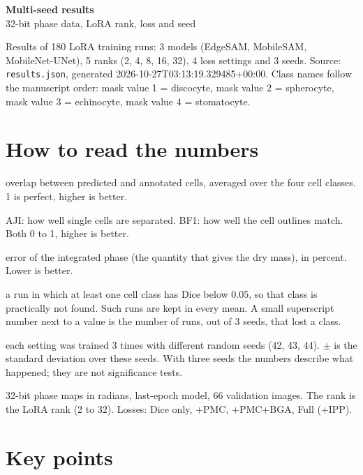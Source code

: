 \documentclass[10pt]{article}
\begin{document}
{\Large\bfseries Multi-seed results}\\[2pt]{\small 32-bit phase data, LoRA rank, loss and seed}\par\vspace{4pt}

Results of 180 LoRA training runs: 3 models (EdgeSAM, MobileSAM, MobileNet-UNet), 5 ranks (2, 4, 8, 16, 32), 4 loss settings and 3 seeds. Source: \texttt{results.json}, generated 2026-10-27T03:13:19.329485+00:00. Class names follow the manuscript order: mask value 1 = discocyte, mask value 2 = spherocyte, mask value 3 = echinocyte, mask value 4 = stomatocyte.

\section*{How to read the numbers}
\begin{description}\itemsep1pt
\item[Dice] overlap between predicted and annotated cells, averaged over the four cell classes. 1 is perfect, higher is better.
\item[AJI, BF1] AJI: how well single cells are separated. BF1: how well the cell outlines match. Both 0 to 1, higher is better.
\item[IPE] error of the integrated phase (the quantity that gives the dry mass), in percent. Lower is better.
\item[Lost class] a run in which at least one cell class has Dice below 0.05, so that class is practically not found. Such runs are kept in every mean. A small superscript number next to a value is the number of runs, out of 3 seeds, that lost a class.
\item[Seeds] each setting was trained 3 times with different random seeds (42, 43, 44). $\pm$ is the standard deviation over these seeds. With three seeds the numbers describe what happened; they are not significance tests.
\item[Setting] 32-bit phase maps in radians, last-epoch model, 66 validation images. The rank is the LoRA rank (2 to 32). Losses: Dice only, +PMC, +PMC+BGA, Full (+IPP).
\end{description}

\section*{Key points}
\end{document}
